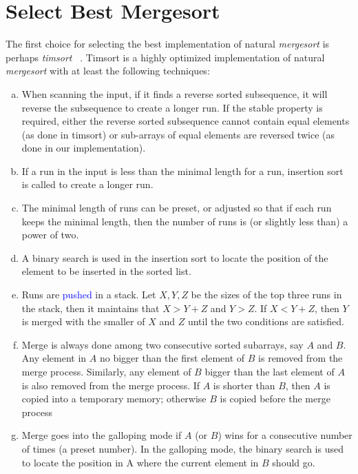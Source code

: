 \documentclass[AMA,STIX1COL]{WileyNJD-v2}
\newcommand{\tsort}{\emph{timsort }}
\newcommand{\msort}{\emph{mergesort }}
\begin{document}
\section{Select Best Mergesort}        
The first choice for selecting the best implementation of natural \msort is perhaps \tsort~\cite{timsort}. Timsort is a highly optimized implementation of natural \msort with at least the following techniques:
\begin{enumerate}[(a)]
\item When scanning the input, if it finds a reverse sorted subsequence, it will reverse the subsequence to create a longer run. If the stable property is required, either the reverse sorted subsequence cannot contain equal elements (as done in timsort) or sub-arrays of equal elements are reversed twice (as done in our implementation).
\item If a run in the input is less than the minimal length for a run, insertion sort is called to create a longer run. 
\item The minimal length of runs can be preset, or adjusted so that if each run keeps the minimal length, then the number of runs is (or slightly less than) a power of two.
\item A binary search is used in the insertion sort to locate the position of the element to be inserted in the sorted list.
\item Runs are \textcolor{blue}{pushed} in a stack. Let $X, Y, Z$ be the sizes of the top three runs in the stack, then it maintains that $X > Y+Z$ and $Y > Z$.  
If $X < Y+Z$, then $Y$ is merged with the smaller of $X$ and $Z$ until the two conditions are satisfied. 
\item Merge is always done among two consecutive sorted subarrays, say $A$ and $B$. 
Any element in $A$ no bigger than the first element of $B$ is removed from the merge process. 
Similarly, any element of $B$ bigger than the last element of $A$ is also removed from the merge process. 
If $A$ is shorter than $B$, then $A$ is copied into a temporary memory; otherwise $B$ is copied before the merge process
\item Merge goes into the galloping mode if $A$ (or $B$) wins for a consecutive number of times (a preset number). 
In the galloping mode, the binary search is used to locate the position in A where the current element in $B$ should go.
\end{enumerate}
\end{document}

